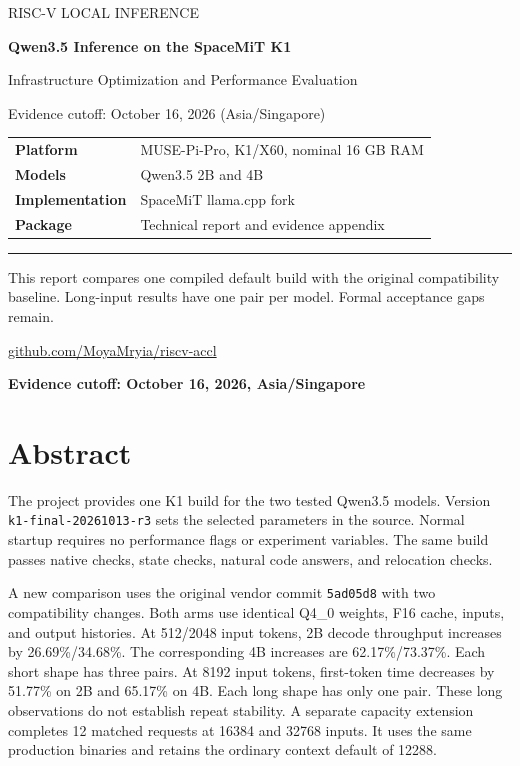 \documentclass[10pt,a4paper]{article}
\begin{document}
\begin{titlepage}
\vspace*{15mm}
{\large\textcolor{reportblue}{RISC-V LOCAL INFERENCE}}\par
\vspace{12mm}
{\Huge\bfseries Qwen3.5 Inference on the SpaceMiT K1\par}
\vspace{8mm}
{\Large Infrastructure Optimization and Performance Evaluation\par}
\vspace{12mm}
{\large Evidence cutoff: October 16, 2026 (Asia/Singapore)\par}
\vspace{14mm}
\begin{tabular}{@{}ll@{}}
\textbf{Platform} & MUSE-Pi-Pro, K1/X60, nominal 16 GB RAM \\
\textbf{Models} & Qwen3.5 2B and 4B \\
\textbf{Implementation} & SpaceMiT llama.cpp fork \\
\textbf{Package} & Technical report and evidence appendix \\
\end{tabular}
\vfill
\textcolor{reportblue}{\rule{\textwidth}{1pt}}\par
This report compares one compiled default build with the original compatibility baseline.
Long-input results have one pair per model. Formal acceptance gaps remain.\par
\vspace{6mm}
\href{https://github.com/MoyaMryia/riscv-accl}{github.com/MoyaMryia/riscv-accl}
\end{titlepage}
{\small\tableofcontents}
\clearpage
\textbf{Evidence cutoff: October 16, 2026, Asia/Singapore}

\hypertarget{abstract}{%
\section{Abstract}\label{abstract}}

The project provides one K1 build for the two tested Qwen3.5 models.
Version \nolinkurl{k1-final-20261013-r3} sets the selected parameters in
the source. Normal startup requires no performance flags or experiment
variables. The same build passes native checks, state checks, natural
code answers, and relocation checks.

A new comparison uses the original vendor commit \nolinkurl{5ad05d8}
with two compatibility changes. Both arms use identical Q4\_0 weights,
F16 cache, inputs, and output histories. At 512/2048 input tokens, 2B
decode throughput increases by 26.69\%/34.68\%. The corresponding 4B
increases are 62.17\%/73.37\%. Each short shape has three pairs. At 8192
input tokens, first-token time decreases by 51.77\% on 2B and 65.17\% on
4B. Each long shape has only one pair. These long observations do not
establish repeat stability. A separate capacity extension completes 12
matched requests at 16384 and 32768 inputs. It uses the same production
binaries and retains the ordinary context default of 12288.
\end{document}
